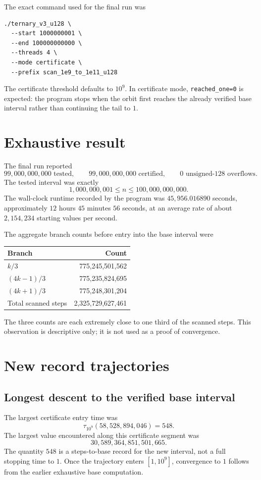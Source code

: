 \documentclass[11pt]{article}
\begin{document}
The exact command used for the final run was
\begin{verbatim}
./ternary_v3_u128 \
  --start 1000000001 \
  --end 100000000000 \
  --threads 4 \
  --mode certificate \
  --prefix scan_1e9_to_1e11_u128
\end{verbatim}
The certificate threshold defaults to $10^9$. In certificate mode, \texttt{reached\_one=0} is expected: the program stops when the orbit first reaches the already verified base interval rather than continuing the tail to $1$.

\section{Exhaustive result}
The final run reported
\[
\boxed{99,000,000,000\text{ tested}},\qquad
\boxed{99,000,000,000\text{ certified}},\qquad
\boxed{0\text{ unsigned-128 overflows}}.
\]
The tested interval was exactly
\[
1,000,000,001\le n\le100,000,000,000.
\]
The wall-clock runtime recorded by the program was $45,956.016890$ seconds, approximately $12$ hours $45$ minutes $56$ seconds, at an average rate of about $2,154,234$ starting values per second.

The aggregate branch counts before entry into the base interval were
\begin{center}
\begin{tabular}{lr}
\toprule
Branch & Count\\
\midrule
$k/3$ & 775,245,501,562\\
$(4k-1)/3$ & 775,235,824,695\\
$(4k+1)/3$ & 775,248,301,204\\
\midrule
Total scanned steps & 2,325,729,627,461\\
\bottomrule
\end{tabular}
\end{center}
The three counts are each extremely close to one third of the scanned steps. This observation is descriptive only; it is not used as a proof of convergence.

\section{New record trajectories}
\subsection{Longest descent to the verified base interval}
The largest certificate entry time was
\[
\boxed{\tau_{10^9}(58,528,894,046)=548}.
\]
The largest value encountered along this certificate segment was
\[
30,589,364,851,501,665.
\]
The quantity $548$ is a steps-to-base record for the new interval, not a full stopping time to $1$. Once the trajectory enters $[1,10^9]$, convergence to $1$ follows from the earlier exhaustive base computation.
\end{document}
